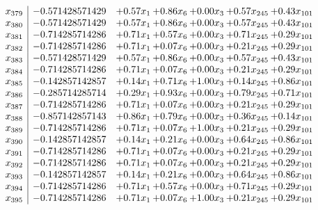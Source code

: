\documentclass[8pt]{article}
\begin{document}
\[\begin{array}{c| c c@{\hskip 2pt} c@{\hskip 2pt} c@{\hskip 2pt} c@{\hskip 2pt} c@{\hskip 2pt} }
 x_{379}   &  -0.571428571429 & +  0.57 x_{1} & +  0.86 x_{6} & +  0.00 x_{3} & +  0.57 x_{245} & +  0.43 x_{101}\\
 x_{380}   &  -0.571428571429 & +  0.57 x_{1} & +  0.86 x_{6} & +  0.00 x_{3} & +  0.57 x_{245} & +  0.43 x_{101}\\
 x_{381}   &  -0.714285714286 & +  0.71 x_{1} & +  0.57 x_{6} & +  0.00 x_{3} & +  0.71 x_{245} & +  0.29 x_{101}\\
 x_{382}   &  -0.714285714286 & +  0.71 x_{1} & +  0.07 x_{6} & +  0.00 x_{3} & +  0.21 x_{245} & +  0.29 x_{101}\\
 x_{383}   &  -0.571428571429 & +  0.57 x_{1} & +  0.86 x_{6} & +  0.00 x_{3} & +  0.57 x_{245} & +  0.43 x_{101}\\
 x_{384}   &  -0.714285714286 & +  0.71 x_{1} & +  0.07 x_{6} & +  0.00 x_{3} & +  0.21 x_{245} & +  0.29 x_{101}\\
 x_{385}   &  -0.142857142857 & +  0.14 x_{1} & +  0.71 x_{6} & +  1.00 x_{3} & +  0.14 x_{245} & +  0.86 x_{101}\\
 x_{386}   &  -0.285714285714 & +  0.29 x_{1} & +  0.93 x_{6} & +  0.00 x_{3} & +  0.79 x_{245} & +  0.71 x_{101}\\
 x_{387}   &  -0.714285714286 & +  0.71 x_{1} & +  0.07 x_{6} & +  0.00 x_{3} & +  0.21 x_{245} & +  0.29 x_{101}\\
 x_{388}   &  -0.857142857143 & +  0.86 x_{1} & +  0.79 x_{6} & +  0.00 x_{3} & +  0.36 x_{245} & +  0.14 x_{101}\\
 x_{389}   &  -0.714285714286 & +  0.71 x_{1} & +  0.07 x_{6} & +  1.00 x_{3} & +  0.21 x_{245} & +  0.29 x_{101}\\
 x_{390}   &  -0.142857142857 & +  0.14 x_{1} & +  0.21 x_{6} & +  0.00 x_{3} & +  0.64 x_{245} & +  0.86 x_{101}\\
 x_{391}   &  -0.714285714286 & +  0.71 x_{1} & +  0.07 x_{6} & +  0.00 x_{3} & +  0.21 x_{245} & +  0.29 x_{101}\\
 x_{392}   &  -0.714285714286 & +  0.71 x_{1} & +  0.07 x_{6} & +  0.00 x_{3} & +  0.21 x_{245} & +  0.29 x_{101}\\
 x_{393}   &  -0.142857142857 & +  0.14 x_{1} & +  0.21 x_{6} & +  0.00 x_{3} & +  0.64 x_{245} & +  0.86 x_{101}\\
 x_{394}   &  -0.714285714286 & +  0.71 x_{1} & +  0.57 x_{6} & +  0.00 x_{3} & +  0.71 x_{245} & +  0.29 x_{101}\\
 x_{395}   &  -0.714285714286 & +  0.71 x_{1} & +  0.07 x_{6} & +  1.00 x_{3} & +  0.21 x_{245} & +  0.29 x_{101}\\

\end{array}\]
\end{document}
